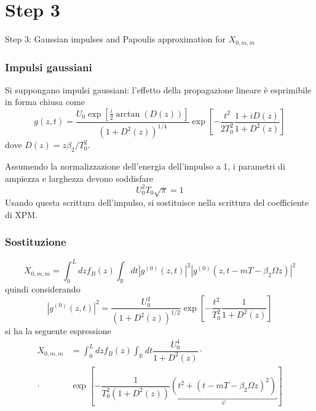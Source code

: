 \documentclass[8pt]{beamer} %
\begin{document}
\section{Step 3}
\begin{frame}
    \Huge{Step 3: Gaussian impulses and Papoulis approximation for $X_{0, m, m}$}
\end{frame}

\begin{frame}
    \frametitle{Impulsi gaussiani}
    Si suppongano impulsi gaussiani: l'effetto della propagazione lineare è esprimibile in forma chiusa come
    \begin{equation}\label{eq:field}
        g(z, t) = \frac{U_0 \exp[\frac{i}{2} \arctan(D(z))]}{(1+D^2(z))^{1/4}} \exp\left[-\frac{t^2}{2T_0^2} \frac{1+iD(z)}{1+D^2(z)}\right]
    \end{equation}
    dove $D(z) = z\beta_2 / T_0^2$.
    \vspace{10pt}

    Assumendo la normalizzazione dell'energia dell'impulso a 1, i parametri di ampiezza e larghezza devono soddisfare
    \begin{equation}\label{eq:norm}
        U_0^2T_0 \sqrt{\pi} = 1
    \end{equation}
    Usando questa scrittura dell'impulso, si sostituisce nella scrittura del coefficiente di XPM.
\end{frame}

\begin{frame}
    \frametitle{Sostituzione}
    \begin{equation}
        X_{0, m, m} = \int_{0}^{L}dz f_B(z) \int_{\mathbb{R}}dt |g^{(0)}(z, t)|^2 |g^{(0)}(z, t- m T-\beta_2\Omega z)|^2
    \end{equation}
    quindi considerando
    \begin{equation*}
        |g^{(0)}(z, t)|^2 = \dfrac{U_0^2}{(1+D^2(z))^{1/2}}\exp\left[-\dfrac{t^2}{T_0^2} \dfrac{1}{1+D^2(z)}\right]
    \end{equation*}
    si ha la seguente espressione
    \begin{align*}
        X_{0, m, m} & = \int_{0}^{L}dz f_B(z) \int_{\mathbb{R}}dt
        \dfrac{U_0^4}{1+D^2(z)} \cdot                             \\ \cdot  &\exp\left[-\dfrac{1}{T_0^2(1+D^2(z))}
            \underbracket{\left(t^2 + (t-mT-\beta_2\Omega z)^2\right)}_{\varphi}\right]
    \end{align*}
\end{frame}
\end{document}
